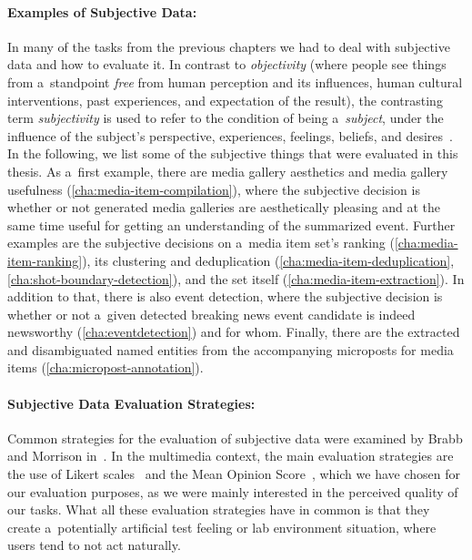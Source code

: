 \paragraph{Examples of Subjective Data:}

In many of the tasks from the previous chapters
we had to deal with subjective data and how to evaluate it.
In contrast to \emph{objectivity} (where people see things
from a~standpoint \emph{free} from human perception and its influences,
human cultural interventions, past experiences,
and expectation of the result),
the contrasting term \emph{subjectivity} is used to refer to the condition
of being a~\emph{subject}, under the influence of the subject's perspective, experiences,
feelings, beliefs, and desires~\cite{honderich2005oxford}.
In the following, we list some of the subjective things
that were evaluated in this thesis.
As a~first example, there are media gallery aesthetics and media gallery usefulness
(\autoref{cha:media-item-compilation}),
where the subjective decision is whether
or not generated media galleries are aesthetically pleasing
and at the same time useful for getting an understanding
of the summarized event.
Further examples are the subjective decisions on a~media item set's
ranking (\autoref{cha:media-item-ranking}),
its clustering and deduplication (\autoref{cha:media-item-deduplication}, \autoref{cha:shot-boundary-detection}),
and the set itself (\autoref{cha:media-item-extraction}).
In addition to that, there is also event detection,
where the subjective decision is whether or not a~given detected breaking news event candidate is indeed newsworthy (\autoref{cha:eventdetection}) and for whom.
Finally, there are the extracted and disambiguated named entities
from the accompanying microposts for media items
(\autoref{cha:micropost-annotation}).

\paragraph{Subjective Data Evaluation Strategies:}

Common strategies for the evaluation of subjective data were
examined by Brabb and Morrison in~\cite{brabb1964evaluation}.
In the multimedia context, the main evaluation strategies are
the use of Likert scales~\cite{likert1932likertscale}
and the Mean Opinion Score~\cite{itu1998mos},
which we have chosen for our evaluation purposes,
as we were mainly interested in the perceived quality of our tasks.
What all these evaluation strategies have in common is
that they create a~potentially artificial test feeling
or lab environment situation, where users tend to not act naturally.

